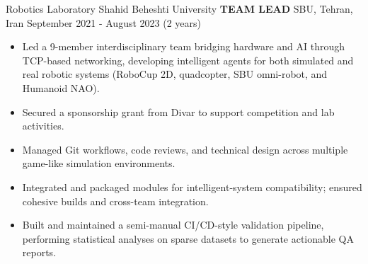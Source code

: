 \begin{cventries}
    \cventry
    {Robotics Laboratory \textemdash Shahid Beheshti University}
    {\textbf{TEAM LEAD}}
    {SBU, Tehran, Iran}
    {September 2021 - August 2023 (2 years)}
    {
        \begin{itemize}
            \item Led a 9-member interdisciplinary team bridging hardware and AI through TCP-based networking, developing intelligent agents for both simulated and real robotic systems (RoboCup 2D, quadcopter, SBU omni-robot, and Humanoid NAO).
            \item Secured a sponsorship grant from Divar to support competition and lab activities.
            \item Managed Git workflows, code reviews, and technical design across multiple game-like simulation environments.
            \item Integrated and packaged modules for intelligent-system compatibility; ensured cohesive builds and cross-team integration.
            \item Built and maintained a semi-manual CI/CD-style validation pipeline, performing statistical analyses on sparse datasets to generate actionable QA reports.
        \end{itemize}
    }
\end{cventries}




